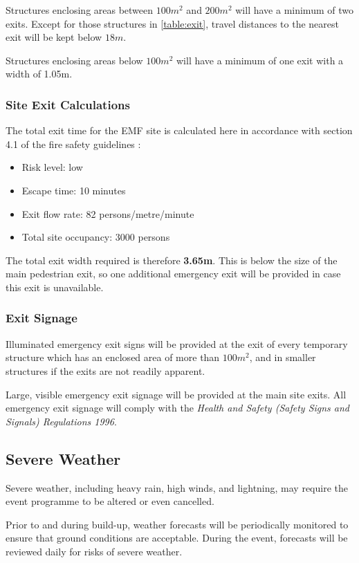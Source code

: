 Structures enclosing areas between $100m^2$ and $200m^2$ will have a minimum of two exits. Except
for those structures in \cref{table:exit}, travel distances to the nearest exit will be kept below $18m$.

Structures enclosing areas below $100m^2$ will have a minimum of one exit with a width of 1.05m.

\subsubsection{Site Exit Calculations}
The total exit time for the EMF site is calculated here in accordance with section 4.1 of the fire safety
guidelines \cite{firesafety}:

\begin{itemize}
\tightlist
\item Risk level: low
\item Escape time: 10 minutes
\item Exit flow rate: 82 persons/metre/minute
\item Total site occupancy: 3000 persons
\end{itemize}

The total exit width required is therefore \textbf{3.65m}. This is below the size of the
main pedestrian exit, so one additional emergency exit will be provided in case this exit
is unavailable.

\subsubsection{Exit Signage}

Illuminated emergency exit signs will be provided at the exit of every temporary structure which
has an enclosed area of more than $100m^2$, and in smaller structures if the exits are not
readily apparent.

Large, visible emergency exit signage will be provided at the main site exits. All emergency exit
signage will comply with the \textit{Health and Safety (Safety Signs and Signals) Regulations 1996}.

\subsection{Severe Weather}
\label{severe-weather}
Severe weather, including heavy rain, high winds, and lightning, may require the event
programme to be altered or even cancelled.

Prior to and during build-up, weather forecasts will be periodically monitored to ensure
that ground conditions are acceptable. During the event, forecasts will be reviewed
daily for risks of severe weather.

